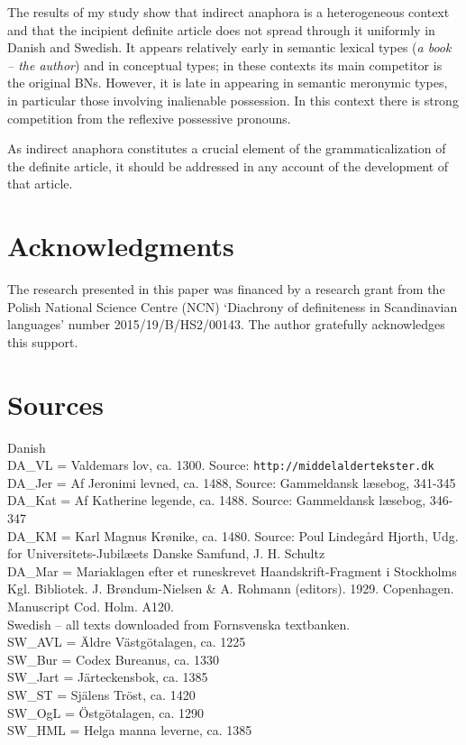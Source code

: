 \documentclass[output=paper]{langsci/langscibook}
\begin{document}
The results of my study show that indirect anaphora is a heterogeneous context and that the incipient definite article does not spread through it uniformly in Danish and Swedish. It appears relatively early in semantic lexical types ({\emph{a book -- the author}}) and in conceptual types; in these contexts its main competitor is the original BNs. However, it is late in appearing in semantic meronymic types, in particular those involving inalienable possession. In this context there is strong competition from the reflexive possessive pronouns. 

As indirect anaphora constitutes a crucial element of the grammaticalization of the definite article, it should be addressed in any account of the development of that article.

\section*{Acknowledgments}
The research presented in this paper was financed by a research grant from the Polish National Science Centre (NCN) `Diachrony of definiteness in Scandinavian languages' number 2015/19/B/HS2/00143. The author gratefully acknowledges this support.

\section*{Sources}
Danish \\
DA\_VL = Valdemars lov, ca. 1300. Source: {\small\texttt{http://middelaldertekster.dk}} \\ 
DA\_Jer = Af Jeronimi levned, ca. 1488, Source: Gammeldansk læsebog, 341-345 \\
{DA\_Kat = Af Katherine legende, ca. 1488. Source: Gammeldansk læsebog, 346-347} \\
DA\_KM = Karl Magnus Krønike, ca. 1480. Source: Poul Lindegård Hjorth, Udg. for Universitets-Jubilæets Danske Samfund, J. H. Schultz \\
DA\_Mar = Mariaklagen efter et runeskrevet Haandskrift-Fragment i Stockholms Kgl. Bibliotek. J. Brøndum-Nielsen \& A. Rohmann (editors). 1929. Copenhagen. Manuscript Cod. Holm. A120.\\[2mm]
Swedish -- all texts downloaded from Fornsvenska textbanken.  \\
SW\_AVL = Äldre Västgötalagen, ca. 1225 \\
SW\_Bur = Codex Bureanus, ca. 1330 \\
SW\_Jart = Järteckensbok, ca. 1385 \\
SW\_ST = Själens Tröst, ca. 1420 \\
SW\_OgL = Östgötalagen, ca. 1290 \\
SW\_HML = Helga manna leverne, ca. 1385



{\sloppy\printbibliography[heading=subbibliography,notkeyword=this]}
\end{document}
